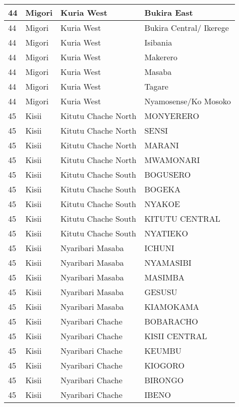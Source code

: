 \begin{table}[!ht]
\begin{tabular}{|l|l|l|l|}
        44 & Migori & Kuria West & Bukira East \\ \hline
        44 & Migori & Kuria West & Bukira Central/ Ikerege \\ \hline
        44 & Migori & Kuria West & Isibania \\ \hline
        44 & Migori & Kuria West & Makerero \\ \hline
        44 & Migori & Kuria West & Masaba \\ \hline
        44 & Migori & Kuria West & Tagare \\ \hline
        44 & Migori & Kuria West & Nyamosense/Ko Mosoko \\ \hline
        45 & Kisii & Kitutu Chache North & MONYERERO \\ \hline
        45 & Kisii & Kitutu Chache North & SENSI \\ \hline
        45 & Kisii & Kitutu Chache North & MARANI \\ \hline
        45 & Kisii & Kitutu Chache North & MWAMONARI \\ \hline
        45 & Kisii & Kitutu Chache South & BOGUSERO \\ \hline
        45 & Kisii & Kitutu Chache South & BOGEKA \\ \hline
        45 & Kisii & Kitutu Chache South & NYAKOE \\ \hline
        45 & Kisii & Kitutu Chache South & KITUTU CENTRAL \\ \hline
        45 & Kisii & Kitutu Chache South & NYATIEKO \\ \hline
        45 & Kisii & Nyaribari Masaba & ICHUNI \\ \hline
        45 & Kisii & Nyaribari Masaba & NYAMASIBI \\ \hline
        45 & Kisii & Nyaribari Masaba & MASIMBA \\ \hline
        45 & Kisii & Nyaribari Masaba & GESUSU \\ \hline
        45 & Kisii & Nyaribari Masaba & KIAMOKAMA \\ \hline
        45 & Kisii & Nyaribari Chache & BOBARACHO \\ \hline
        45 & Kisii & Nyaribari Chache & KISII CENTRAL \\ \hline
        45 & Kisii & Nyaribari Chache & KEUMBU \\ \hline
        45 & Kisii & Nyaribari Chache & KIOGORO \\ \hline
        45 & Kisii & Nyaribari Chache & BIRONGO \\ \hline
        45 & Kisii & Nyaribari Chache & IBENO \\ \hline

\end{tabular}
\end{table}
